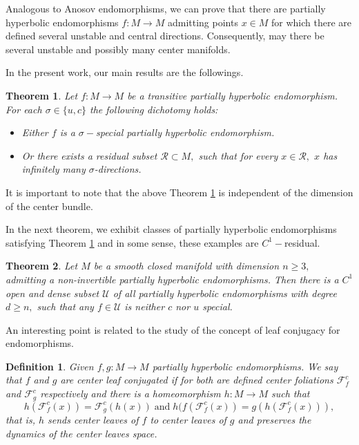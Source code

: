 \documentclass[12pt,reqno]{amsart}
\numberwithin{equation}{section}
\theoremstyle{plain}
\newtheorem{maintheorem}{Theorem}
\newtheorem{definition}[theorem]{Definition}
\theoremstyle{remark}
\begin{document}
Analogous to Anosov endomorphisms,  we can prove that there are partially hyperbolic endomorphisms $f: M \rightarrow M$ admitting points $x\in M$ for which there are defined several unstable and central directions. Consequently, may there be several unstable and possibly many center manifolds.




In the present work, our main results are the followings.





\begin{maintheorem}\label{Teo C}
Let  $f:M\rightarrow M$ be a transitive partially hyperbolic endomorphism. For each $\sigma \in \{u,c\}$  the following dichotomy holds:
\begin{itemize}
\item Either $f$ is a $\sigma-$special partially hyperbolic endomorphism.
\item Or there exists a residual subset $\mathcal{R}\subset M,$ such that for every $x \in \mathcal{R},$ $x$ has
infinitely many $\sigma$-directions.
\end{itemize}

\end{maintheorem}


It is important to note that the above Theorem \ref{Teo C} is independent of the dimension of the center bundle.



In the next theorem, we exhibit classes of partially hyperbolic endomorphisms satisfying  Theorem \ref{Teo C} and in some sense, these examples are $C^1-$residual.
\begin{maintheorem}\label{Teo D}  Let $M$ be a  smooth closed manifold with dimension $n \geq 3,$ admitting a non-invertible partially hyperbolic endomorphisms. Then there is a  $C^1$ open and dense subset $\mathcal{U}$ of all partially hyperbolic endomorphisms with degree $d \geq n,$ such that any $f \in \mathcal{U}$ is neither $c$ nor $u$ special.
\end{maintheorem}


An interesting point is related to the study of the concept of leaf conjugacy for endomorphisms.\begin{definition} Given $f, g : M \rightarrow M$ partially hyperbolic endomorphisms. We say that $f$ and $g$ are center leaf conjugated if for both are defined center foliations $\mathcal{F}^c_f$ and $\mathcal{F}^c_g$ respectively and there is a homeomorphism $h: M \rightarrow M$ such that
$$h(\mathcal{F}_f^c(x)) = \mathcal{F}_g^c(h(x))\; \mbox{and}\; h(f(\mathcal{F}^c_f(x)) = g(h(\mathcal{F}^c_f(x))),$$
that is, $h$ sends center leaves of $f$ to center leaves of $g$ and preserves the dynamics of the center leaves space.
\end{definition}
\end{document}
